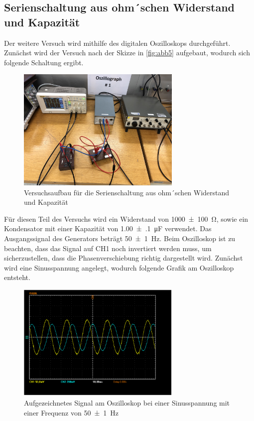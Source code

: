 \documentclass[11pt,ngerman]{scrartcl}
\begin{document}
\newpage

\subsection{Serienschaltung aus ohm´schen Widerstand und Kapazität}

Der weitere Versuch wird mithilfe des digitalen Oszilloskops durchgeführt. Zunächst wird der Versuch nach der Skizze in \autoref{fig:abb5} aufgebaut, wodurch sich folgende Schaltung ergibt.

\begin{figure}[H]
	\begin{center}
		\includegraphics[width=0.7\textwidth]{aufbau_c}
	\end{center}
	\caption{Versuchsaufbau für die Serienschaltung aus ohm´schen Widerstand und Kapazität}
	\label{fig:aufbau_c}
\end{figure}

Für diesen Teil des Versuchs wird ein Widerstand von \SI{1000(100)}{\ohm}, sowie ein Kondensator mit einer Kapazität von \SI{1.00(10)}{\micro\farad}	 verwendet. Das Ausgangssignal des Generators beträgt \SI{50(1)}{\hertz}. Beim Oszilloskop ist zu beachten, dass das Signal auf CH1 noch invertiert werden muss, um sicherzustellen, dass die Phasenverschiebung richtig dargestellt wird. Zunächst wird eine Sinusspannung angelegt, wodurch folgende Grafik am Oszilloskop entsteht.

\begin{figure}[H]
	\begin{center}
		\includegraphics[width=0.7\textwidth]{Bild_versuch1}
	\end{center}
	\caption{Aufgezeichnetes Signal am Oszilloskop bei einer Sinusspannung mit einer Frequenz von \SI{50(1)}{\hertz}}
	\label{fig:sinusschw}
\end{figure}
\end{document}

